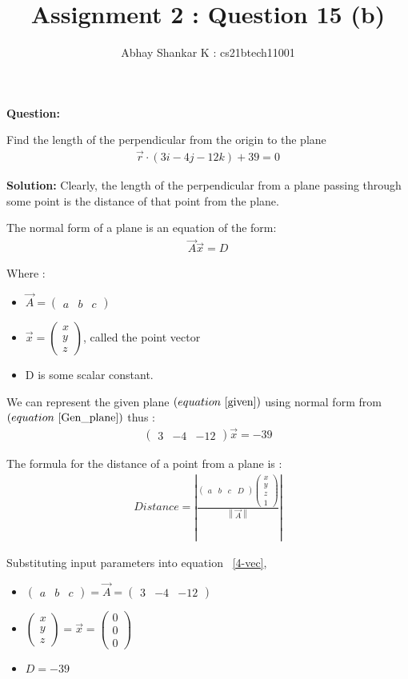 \documentclass[11pt, oneside, twocolumn, reqno]{article}   	%
\title{Assignment 2 : Question 15 (b)}
\author{Abhay Shankar K : cs21btech11001}
\newcommand{\myvec}[1]{\ensuremath{\begin{pmatrix}#1\end{pmatrix}}}
\providecommand{\norm}[1]{\left\lVert#1\right\rVert}
\providecommand{\abs}[1]{\left\vert#1\right\vert}
\providecommand{\brak}[1]{\ensuremath{\left(#1\right)}}
\newcommand{\question}{\noindent \textbf{Question: }}
\newcommand{\solution}{\noindent \textbf{Solution: }}
\begin{document}
\maketitle

\question

Find the length of the perpendicular from the origin to the plane
\begin{align} \label{given}
	\vec{r} \cdot \brak{3i - 4j - 12k} + 39 = 0
\end{align}

\solution
Clearly, the length of the perpendicular from a plane passing through some point is the distance of that point from the plane.

The normal form of a plane is an equation of the form:\
\begin{align}\label{Gen_plane}
	\vec{A}\vec{x} = D
\end{align}

Where :
\begin{itemize}
	\item $\vec{A} = \myvec{a & b & c}$
	\item $\vec{x} = \myvec{x \\ y \\ z}$, called the point vector
	\item D is some scalar constant.
\end{itemize}

We can represent the given plane \brak{equation ~\eqref{given}} using normal form from \brak{equation ~\eqref{Gen_plane}} thus :
\begin{align} \label{normal_form}
	\myvec{3 & -4 & -12} \vec{x} = -39
\end{align}

The formula for the distance of a point from a plane is :
\begin{align} \label{4-vec}
	Distance = \abs{\frac{\myvec{a & b & c & D} \myvec{x \\ y \\ z \\ 1}}{\norm{\vec{A}}}}
\end{align}

Substituting input parameters into equation ~\eqref{4-vec},

\begin{itemize}
	\item $\myvec{a & b & c} = \vec{A} = \myvec{3 & -4 & -12} \label{A_sub}$
	\item $\myvec{x \\ y \\ z} = \vec{x} = \myvec{0 \\ 0 \\ 0} \label{x_sub}$
	\item $D = -39 \label{D_sub} $
\end{itemize}
\end{document}
